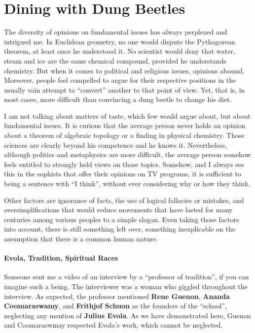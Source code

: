\section{Dining with Dung Beetles}

The diversity of opinions on fundamental issues has always perplexed and intrigued me. In Euclidean geometry, no one would dispute the Pythagorean theorem, at least once he understood it. No scientist would deny that water, steam and ice are the same chemical compound, provided he understands chemistry. But when it comes to political and religious issues, opinions abound. Moreover, people feel compelled to argue for their respective positions in the usually vain attempt to ``convert'' another to that point of view. Yet, that is, in most cases, more difficult than convincing a dung beetle to change his diet.

I am not talking about matters of taste, which few would argue about, but about fundamental issues. It is curious that the average person never holds an opinion about a theorem of algebraic topology or a finding in physical chemistry. Those sciences are clearly beyond his competence and he knows it. Nevertheless, although politics and metaphysics are more difficult, the average person somehow feels entitled to strongly held views on those topics. Somehow, and I always see this in the sophists that offer their opinions on TV programs, it is sufficient to being a sentence with ``I think'', without ever considering why or how they think.

Other factors are ignorance of facts, the use of logical fallacies or mistakes, and oversimplifications that would reduce movements that have lasted for many centuries among various peoples to a simple slogan. Even taking those factors into account, there is still something left over, something inexplicable on the assumption that there is a common human nature.

\paragraph{Evola, Tradition, Spiritual Races}


Someone sent me a video of an interview by a ``professor of tradition'', if you can imagine such a being. The interviewer was a woman who giggled throughout the interview. As expected, the professor mentioned \textbf{Rene Guenon}, \textbf{Ananda Coomaraswamy}, and \textbf{Frithjof Schuon} as the founders of the ``school'', neglecting any mention of \textbf{Julius Evola}. As we have demonstrated here, Guenon and Coomaraswmay respected Evola's work, which cannot be neglected.

